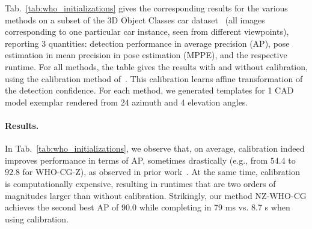 Tab.~\ref{tab:who_initializations} gives the corresponding results for
the various methods on a subset of the 3D Object Classes car
dataset~\cite{Savarese07} (all images corresponding to one particular
car instance, seen from different viewpoints), reporting 3 quantities:
detection performance in average precision (AP), pose estimation in mean
precision in pose estimation (MPPE), and the respective runtime.
%
For all methods, the table gives the results with and without
calibration, using the calibration method of~\cite{Aubry14}. This
calibration learns affine transformation of the detection confidence.
For each method, we generated templates for 1 CAD model exemplar
rendered from 24 azimuth and 4 elevation angles.

\paragraph{Results.}
In Tab.~\ref{tab:who_initializations}, we observe that, on average,
calibration indeed improves performance in terms of AP, sometimes
drastically (e.g., from $54.4$ to $92.8$ for WHO-CG-Z), as observed in
prior work~\cite{Aubry14}. At the same time, calibration is
computationally expensive, resulting in runtimes that are two orders of
magnitudes larger than without calibration. Strikingly, our method
NZ-WHO-CG achieves the second best AP of $90.0$ while completing in 79
ms vs. 8.7 s when using calibration.



